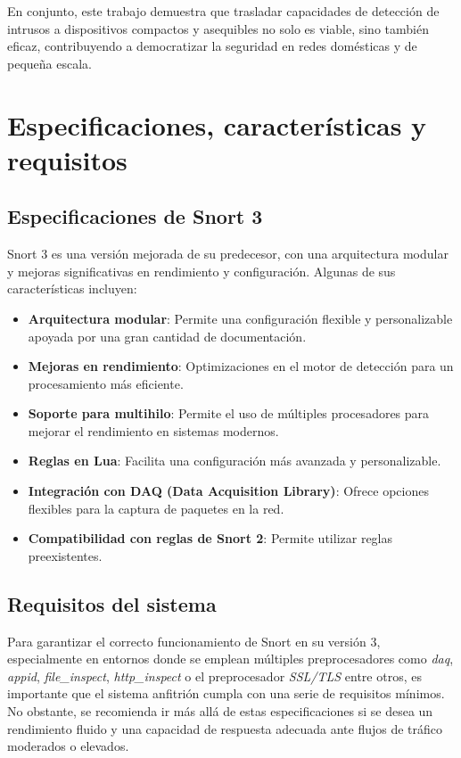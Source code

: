 \documentclass[11pt,a4paper,twoside]{report}
\begin{document}
En conjunto, este trabajo demuestra que trasladar capacidades de detección de intrusos a dispositivos compactos y asequibles no solo es viable, sino también eficaz, contribuyendo a democratizar la seguridad en redes domésticas y de pequeña escala.


\section{Especificaciones, características y requisitos}

\subsection{Especificaciones de Snort 3}

Snort 3 es una versión mejorada de su predecesor, con una arquitectura modular y mejoras significativas en rendimiento y configuración. Algunas de sus características incluyen:

\begin{itemize}
\item \textbf{Arquitectura modular}: Permite una configuración flexible y personalizable apoyada por una gran cantidad de documentación.
\item \textbf{Mejoras en rendimiento}: Optimizaciones en el motor de detección para un procesamiento más eficiente.
\item \textbf{Soporte para multihilo}: Permite el uso de múltiples procesadores para mejorar el rendimiento en sistemas modernos.
\item \textbf{Reglas en Lua}: Facilita una configuración más avanzada y personalizable.
\item \textbf{Integración con DAQ (Data Acquisition Library)}: Ofrece opciones flexibles para la captura de paquetes en la red.
\item \textbf{Compatibilidad con reglas de Snort 2}: Permite utilizar reglas preexistentes.
\end{itemize}

\subsection{Requisitos del sistema}

Para garantizar el correcto funcionamiento de Snort en su versión 3, especialmente en entornos donde se emplean múltiples preprocesadores como \textit{daq}, \textit{appid}, \textit{file\_inspect}, \textit{http\_inspect} o el preprocesador \textit{SSL/TLS} entre otros, es importante que el sistema anfitrión cumpla con una serie de requisitos mínimos. No obstante, se recomienda ir más allá de estas especificaciones si se desea un rendimiento fluido y una capacidad de respuesta adecuada ante flujos de tráfico moderados o elevados.\newline
\end{document}
